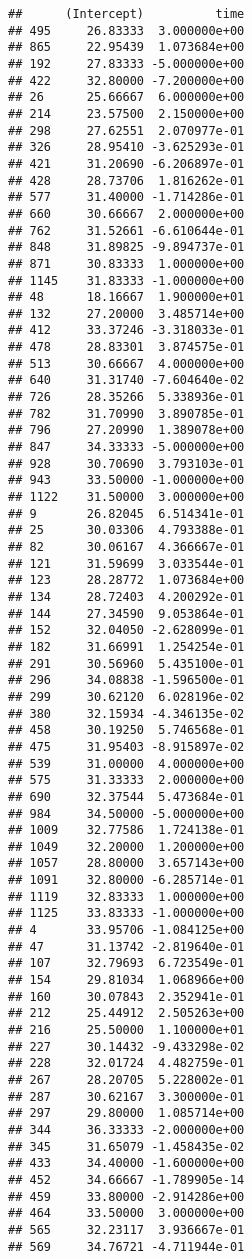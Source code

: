 \documentclass[
]{article}
\begin{document}
\begin{verbatim}
##      (Intercept)          time
## 495     26.83333  3.000000e+00
## 865     22.95439  1.073684e+00
## 192     27.83333 -5.000000e+00
## 422     32.80000 -7.200000e+00
## 26      25.66667  6.000000e+00
## 214     23.57500  2.150000e+00
## 298     27.62551  2.070977e-01
## 326     28.95410 -3.625293e-01
## 421     31.20690 -6.206897e-01
## 428     28.73706  1.816262e-01
## 577     31.40000 -1.714286e-01
## 660     30.66667  2.000000e+00
## 762     31.52661 -6.610644e-01
## 848     31.89825 -9.894737e-01
## 871     30.83333  1.000000e+00
## 1145    31.83333 -1.000000e+00
## 48      18.16667  1.900000e+01
## 132     27.20000  3.485714e+00
## 412     33.37246 -3.318033e-01
## 478     28.83301  3.874575e-01
## 513     30.66667  4.000000e+00
## 640     31.31740 -7.604640e-02
## 726     28.35266  5.338936e-01
## 782     31.70990  3.890785e-01
## 796     27.20990  1.389078e+00
## 847     34.33333 -5.000000e+00
## 928     30.70690  3.793103e-01
## 943     33.50000 -1.000000e+00
## 1122    31.50000  3.000000e+00
## 9       26.82045  6.514341e-01
## 25      30.03306  4.793388e-01
## 82      30.06167  4.366667e-01
## 121     31.59699  3.033544e-01
## 123     28.28772  1.073684e+00
## 134     28.72403  4.200292e-01
## 144     27.34590  9.053864e-01
## 152     32.04050 -2.628099e-01
## 182     31.66991  1.254254e-01
## 291     30.56960  5.435100e-01
## 296     34.08838 -1.596500e-01
## 299     30.62120  6.028196e-02
## 380     32.15934 -4.346135e-02
## 458     30.19250  5.746568e-01
## 475     31.95403 -8.915897e-02
## 539     31.00000  4.000000e+00
## 575     31.33333  2.000000e+00
## 690     32.37544  5.473684e-01
## 984     34.50000 -5.000000e+00
## 1009    32.77586  1.724138e-01
## 1049    32.20000  1.200000e+00
## 1057    28.80000  3.657143e+00
## 1091    32.80000 -6.285714e-01
## 1119    32.83333  1.000000e+00
## 1125    33.83333 -1.000000e+00
## 4       33.95706 -1.084125e+00
## 47      31.13742 -2.819640e-01
## 107     32.79693  6.723549e-01
## 154     29.81034  1.068966e+00
## 160     30.07843  2.352941e-01
## 212     25.44912  2.505263e+00
## 216     25.50000  1.100000e+01
## 227     30.14432 -9.433298e-02
## 228     32.01724  4.482759e-01
## 267     28.20705  5.228002e-01
## 287     30.62167  3.300000e-01
## 297     29.80000  1.085714e+00
## 344     36.33333 -2.000000e+00
## 345     31.65079 -1.458435e-02
## 433     34.40000 -1.600000e+00
## 452     34.66667 -1.789905e-14
## 459     33.80000 -2.914286e+00
## 464     33.50000  3.000000e+00
## 565     32.23117  3.936667e-01
## 569     34.76721 -4.711944e-01

\end{verbatim}
\end{document}
